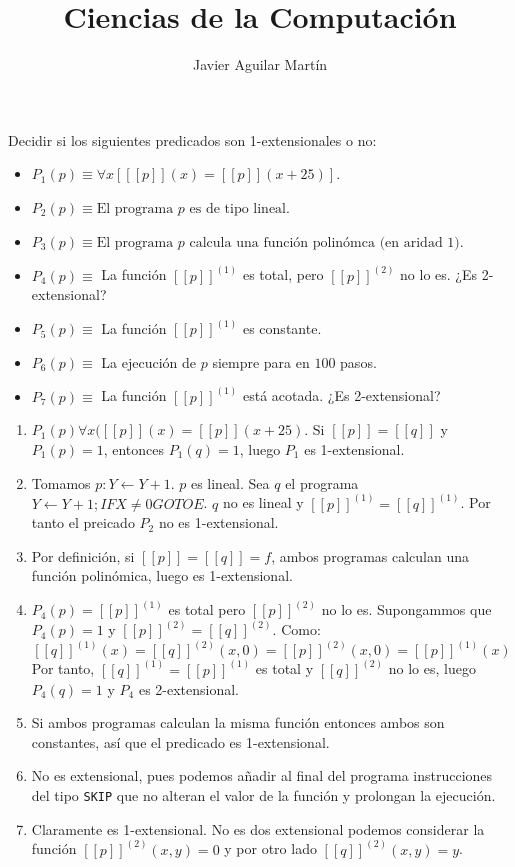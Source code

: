 \documentclass[twoside]{article}
\begin{document}
\title{Ciencias de la Computación}

\author{Javier Aguilar Martín}
\maketitle

\begin{ejercicio}{1}
Decidir si los siguientes predicados son 1-extensionales o no:
\begin{itemize}
	\item $P_1(p) \equiv \forall x [[\![p]\!](x) = [[p]](x+25)]$.
	\item $P_2(p) \equiv \text{El programa }p\text{ es de tipo lineal}$.
	\item $P_3(p) \equiv \text{El programa }p\text{ calcula una función polinómca (en aridad 1)}$.
	\item $P_4(p) \equiv$ La función $[[p]]^{(1)}$ es total, pero $[[p]]^{(2)}$ no lo es. ¿Es 2-extensional?
	\item $P_5(p) \equiv$ La función $[[p]]^{(1)}$ es constante.
	\item $P_6(p) \equiv$ La ejecución de $p$ siempre para en $100$ pasos.
	\item $P_7(p) \equiv$ La función $[[p]]^{(1)}$ está acotada. ¿Es 2-extensional?
\end{itemize}
\end{ejercicio}
\begin{solucion}
\end{solucion}
\begin{enumerate}
	\item $P_1(p)  \forall x ( [[p]](x) = [[p]](x+25)$. Si $[[p]]=[[q]]$ y $P_1(p) = 1$, entonces $P_1(q) = 1$, luego $P_1$ es 1-extensional.
	
	\item Tomamos $p : Y \leftarrow Y+1$. $p$ es lineal. Sea $q$ el programa $Y \leftarrow Y+1; IF X \neq 0 GOTO E$. $q$ no es lineal y $[[p]]^{(1)} = [[q]]^{(1)}$. Por tanto el preicado $P_2$ no es 1-extensional.
	
	\item Por definición, si $[[p]]=[[q]]=f$, ambos programas calculan una función polinómica, luego es 1-extensional.
	\item $P_4(p) = [[p]]^{(1)}$ es total pero $[[p]]^{(2)}$ no lo es. Supongammos que $P_4(p) = 1$ y $[[p]]^{(2)} = [[q]]^{(2)}$. Como:
	\[ [[q]]^{(1)}(x) = [[q]]^{(2)}(x,0) = [[p]]^{(2)}(x,0) = [[p]]^{(1)}(x) \]
	Por tanto, $[[q]]^{(1)} = [[p]]^{(1)}$ es total y $[[q]]^{(2)}$ no lo es, luego $P_4(q) = 1$ y $P_4$ es 2-extensional.
	\item Si ambos programas calculan la misma función entonces ambos son constantes, así que el predicado es 1-extensional.
	\item No es extensional, pues podemos añadir al final del programa instrucciones del tipo \texttt{SKIP} que no alteran el valor de la función y prolongan la ejecución. 
	\item Claramente es 1-extensional. No es dos extensional podemos considerar la función $[[p]]^{(2)}(x,y)=0$ y por otro lado $[[q]]^{(2)}(x,y)=y$.
\end{enumerate}
\end{document}
